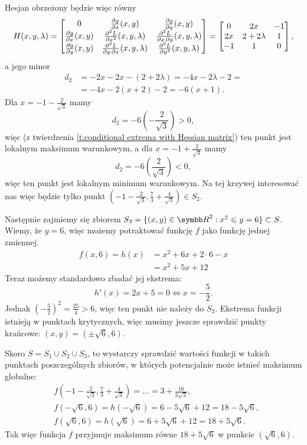 \begin{solution}
    Hesjan obrzeżony będzie więc równy
    \[ H(x, y, \lambda) = \begin{bmatrix}
        0 & \frac{\p{} g}{\p x}(x, y) & \frac{\p{} g}{\p y}(x, y) \\
        \frac{\p g}{\p x}(x, y) & \frac{\p{}^2 L}{\p x^2}(x, y, \lambda) & \frac{\p{}^2 L}{\p x \p y}(x, y, \lambda) \\
        \frac{\p g}{\p y}(x, y) & \frac{\p{}^2 L}{\p y \p x}(x, y, \lambda) & \frac{\p{}^2 L}{\p y^2}(x, y, \lambda)
    \end{bmatrix} = \begin{bmatrix}
        0 & 2x & -1 \\
        2x & 2 + 2\lambda & 1 \\
        -1 & 1 & 0
    \end{bmatrix}, \]
    a jego minor
    \begin{align*}
        d_2 &= -2x - 2x - (2 + 2\lambda) = -4x - 2\lambda - 2 = \\
        &= -4x - 2(x + 2) - 2 = -6(x + 1).
    \end{align*}
    Dla $x = -1 - \frac{2}{\sqrt{3}}$ mamy
    \[ d_2 = -6\left(-\frac{2}{\sqrt{3}}\right) > 0, \]
    więc (z twierdzenia \ref{t:conditional extrema with Hessian matrix}) ten punkt jest lokalnym maksimum warunkowym, a dla $x = -1 + \frac{2}{\sqrt{3}}$ mamy
    \[ d_2 = -6\left(\frac{2}{\sqrt{3}}\right) < 0, \]
    więc ten punkt jest lokalnym minimum warunkowym. Na tej krzywej interesować nas więc będzie tylko punkt $\left(-1-\frac{2}{\sqrt{3}}, \frac{7}{3} + \frac{4}{\sqrt{3}}\right) \in S_2$.

    Następnie zajmiemy się zbiorem $S_3 = \{(x, y) \in \RR^2 : x^2 \leq y = 6\} \subset S$. Wiemy, że $y = 6$, więc możemy potraktować funkcję $f$ jako funkcję jednej zmiennej.
    \begin{align*} f(x, 6) = h(x) &= x^2 + 6x + 2\cdot 6 - x \\
                                  &= x^2 + 5x + 12 \end{align*}
    Teraz możemy standardowo zbadać jej ekstrema:
    \[ h'(x) = 2x + 5 = 0 \iff x = -\frac{5}{2}. \]
    Jednak $\left(-\frac{5}{2}\right)^2 = \frac{25}{4} > 6$, więc ten punkt nie należy do $S_3$. Ekstrema funkcji istnieją w punktach krytycznych, więc musimy jeszcze sprawdzić punkty krańcowe: $(x, y) = (\pm\sqrt{6}, 6)$.

    Skoro $S = S_1 \cup S_2 \cup S_3$, to wystarczy sprawdzić wartości funkcji w takich punktach poszczególnych zbiorów, w których potencjalnie może istnieć maksimum globalne:
    \begin{align*}
        & f\left(-1-\tfrac{2}{\sqrt{3}}, \tfrac{7}{3} + \tfrac{4}{\sqrt{3}}\right) = \ldots = 3 + \tfrac{16}{3\sqrt{3}}, \\
        & f(-\sqrt{6}, 6) = h(-\sqrt{6}) = 6 - 5\sqrt{6} + 12 = 18 - 5\sqrt{6}, \\
        & f(\sqrt{6}, 6) = h(\sqrt{6}) = 6 + 5\sqrt{6} + 12 = 18 + 5\sqrt{6}.
    \end{align*}
    Tak więc funkcja $f$ przyjmuje maksimum równe $18 + 5\sqrt{6}$ w punkcie $\left(\sqrt{6}, 6\right)$.
\end{solution}


